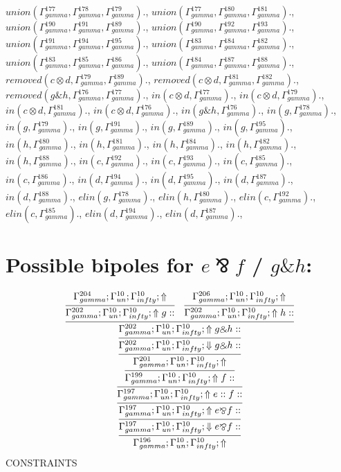 \documentclass[a4paper, 11pt]{article}
\begin{document}
$union(\Gamma_{gamma}^{177}, \Gamma_{gamma}^{178}, \Gamma_{gamma}^{179}).$, $union(\Gamma_{gamma}^{177}, \Gamma_{gamma}^{180}, \Gamma_{gamma}^{181}).$, $union(\Gamma_{gamma}^{190}, \Gamma_{gamma}^{191}, \Gamma_{gamma}^{189}).$, $union(\Gamma_{gamma}^{190}, \Gamma_{gamma}^{192}, \Gamma_{gamma}^{193}).$, $union(\Gamma_{gamma}^{191}, \Gamma_{gamma}^{194}, \Gamma_{gamma}^{195}).$, $union(\Gamma_{gamma}^{183}, \Gamma_{gamma}^{184}, \Gamma_{gamma}^{182}).$, $union(\Gamma_{gamma}^{183}, \Gamma_{gamma}^{185}, \Gamma_{gamma}^{186}).$, $union(\Gamma_{gamma}^{184}, \Gamma_{gamma}^{187}, \Gamma_{gamma}^{188}).$, $removed(c \otimes d, \Gamma_{gamma}^{179}, \Gamma_{gamma}^{189}).$, $removed(c \otimes d, \Gamma_{gamma}^{181}, \Gamma_{gamma}^{182}).$, $removed(g \binampersand h, \Gamma_{gamma}^{176}, \Gamma_{gamma}^{177}).$, $in(c \otimes d, \Gamma_{gamma}^{177}).$, $in(c \otimes d, \Gamma_{gamma}^{179}).$, $in(c \otimes d, \Gamma_{gamma}^{181}).$, $in(c \otimes d, \Gamma_{gamma}^{176}).$, $in(g \binampersand h, \Gamma_{gamma}^{176}).$, $in(g, \Gamma_{gamma}^{178}).$, $in(g, \Gamma_{gamma}^{179}).$, $in(g, \Gamma_{gamma}^{191}).$, $in(g, \Gamma_{gamma}^{189}).$, $in(g, \Gamma_{gamma}^{195}).$, $in(h, \Gamma_{gamma}^{180}).$, $in(h, \Gamma_{gamma}^{181}).$, $in(h, \Gamma_{gamma}^{184}).$, $in(h, \Gamma_{gamma}^{182}).$, $in(h, \Gamma_{gamma}^{188}).$, $in(c, \Gamma_{gamma}^{192}).$, $in(c, \Gamma_{gamma}^{193}).$, $in(c, \Gamma_{gamma}^{185}).$, $in(c, \Gamma_{gamma}^{186}).$, $in(d, \Gamma_{gamma}^{194}).$, $in(d, \Gamma_{gamma}^{195}).$, $in(d, \Gamma_{gamma}^{187}).$, $in(d, \Gamma_{gamma}^{188}).$, $elin(g, \Gamma_{gamma}^{178}).$, $elin(h, \Gamma_{gamma}^{180}).$, $elin(c, \Gamma_{gamma}^{192}).$, $elin(c, \Gamma_{gamma}^{185}).$, $elin(d, \Gamma_{gamma}^{194}).$, $elin(d, \Gamma_{gamma}^{187}).$,


\section{Possible bipoles for $e \bindnasrepma f$ / $g \binampersand h$:} 

{\small
\[
\infer{\Gamma_{ gamma}^{196} ; \Gamma_{un}^{10} ; \Gamma_{ infty}^{10} ;  \Uparrow }
{\infer{\Gamma_{ gamma}^{197} ; \Gamma_{un}^{10} ; \Gamma_{ infty}^{10} ;  \Downarrow e \bindnasrepma f :: }
{\infer{\Gamma_{ gamma}^{197} ; \Gamma_{un}^{10} ; \Gamma_{ infty}^{10} ;  \Uparrow e \bindnasrepma f :: }
{\infer{\Gamma_{ gamma}^{197} ; \Gamma_{un}^{10} ; \Gamma_{ infty}^{10} ;  \Uparrow e :: f :: }
{\infer{\Gamma_{ gamma}^{199} ; \Gamma_{un}^{10} ; \Gamma_{ infty}^{10} ;  \Uparrow f :: }
{\infer{\Gamma_{ gamma}^{201} ; \Gamma_{un}^{10} ; \Gamma_{ infty}^{10} ;  \Uparrow }
{\infer{\Gamma_{ gamma}^{202} ; \Gamma_{un}^{10} ; \Gamma_{ infty}^{10} ;  \Downarrow g \binampersand h :: }
{\infer{\Gamma_{ gamma}^{202} ; \Gamma_{un}^{10} ; \Gamma_{ infty}^{10} ;  \Uparrow g \binampersand h :: }
{\infer{\Gamma_{ gamma}^{202} ; \Gamma_{un}^{10} ; \Gamma_{ infty}^{10} ;  \Uparrow g :: }
{\Gamma_{ gamma}^{204} ; \Gamma_{un}^{10} ; \Gamma_{ infty}^{10} ;  \Uparrow }
&
\infer{\Gamma_{ gamma}^{202} ; \Gamma_{un}^{10} ; \Gamma_{ infty}^{10} ;  \Uparrow h :: }
{\Gamma_{ gamma}^{206} ; \Gamma_{un}^{10} ; \Gamma_{ infty}^{10} ;  \Uparrow }}}}}}}}}
\]
}
CONSTRAINTS
\end{document}
